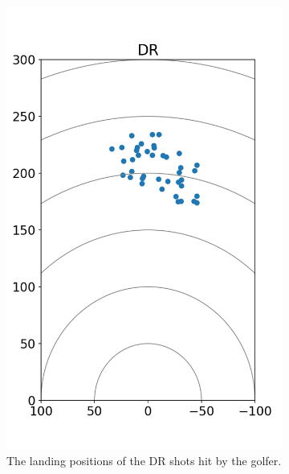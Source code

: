 \documentclass{kththesis}
\begin{document}
\begin{figure}
    \centering
    \begin{subfigure}{0.4\textwidth}
    \centering
    \includegraphics[height=0.4\textheight]{Shots/DR_shots.png} 
    \caption{The landing positions of the DR shots hit by the golfer.}
    \label{fig:DR_shots}
    \end{subfigure}
    \begin{subfigure}{0.4\textwidth}
    \centering

\end{subfigure}
\end{figure}
\end{document}
